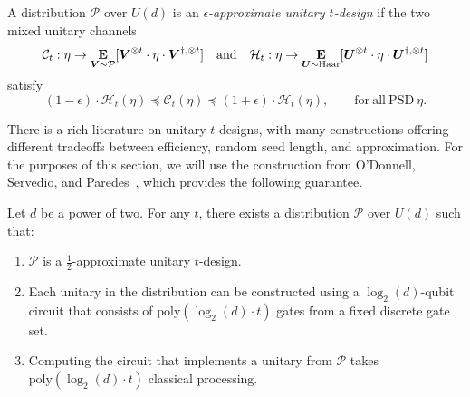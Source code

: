 \documentclass{article}
\begin{document}
\begin{definition}
    \label{def:approximate-t-design}
    A distribution $\mathcal{P}$ over $U(d)$ is an \emph{$\epsilon$-approximate unitary $t$-design} if the two mixed unitary channels
    \begin{equation*}
        \mathcal{C}_t: \eta \to \mathop{\bf E\/}_{\boldsymbol{V} \sim \mathcal{P}} [\boldsymbol{V}^{\otimes t} \cdot \eta \cdot \boldsymbol{V}^{\dagger, \otimes t}]
        \quad
        \mathrm{and}
        \quad
        \mathcal{H}_t :\eta \to \mathop{\bf E\/}_{\boldsymbol{U} \sim \mathrm{Haar}} [\boldsymbol{U}^{\otimes t} \cdot \eta \cdot \boldsymbol{U}^{\dagger, \otimes t}]
    \end{equation*}
    satisfy
    \begin{equation*}
        (1 - \epsilon) \cdot \mathcal{H}_t(\eta) \preceq \mathcal{C}_t(\eta) \preceq (1 + \epsilon) \cdot \mathcal{H}_t(\eta),\qquad
        \mathrm{for~all~PSD}~\eta.
    \end{equation*}
\end{definition}
There is a rich literature on unitary $t$-designs, with many constructions offering different tradeoffs between efficiency, random seed length, and approximation. For the purposes of this section, we will use the construction from O'Donnell, Servedio, and Paredes~\cite{OSP23}, which provides the following guarantee.
\begin{theorem}
    \label{thm:t-design-theorem}
    Let $d$ be a power of two. For any $t$, there exists a distribution $\mathcal{P}$ over $U(d)$ such that:
    \begin{enumerate}
        \item\label{item:apprx-t-design-i} $\mathcal{P}$ is a $\frac{1}{2}$-approximate unitary $t$-design.
        \item\label{item:apprx-t-design-ii} Each unitary in the distribution can be constructed using a $\log_2(d)$-qubit circuit that consists of $\mathrm{poly}(\log_2(d) \cdot t)$ gates from a fixed discrete gate set.
        \item\label{item:apprx-t-design-iii} Computing the circuit that implements a unitary from $\mathcal{P}$ takes $\mathrm{poly}(\log_2(d)\cdot t)$ classical processing.
    \end{enumerate}
\end{theorem}
\end{document}
